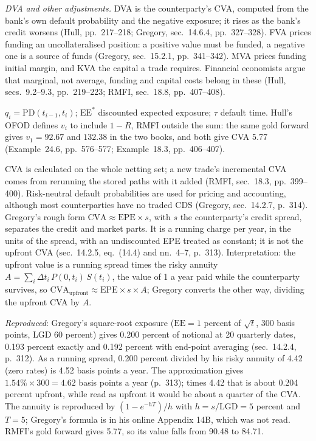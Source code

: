 \begin{qfmethod}
\emph{DVA and other adjustments.} DVA is the counterparty's CVA, computed from the bank's own default probability and the negative exposure; it rises as the bank's credit worsens (Hull, pp.~217--218; Gregory, sec.~14.6.4, pp.~327--328). FVA prices funding an uncollateralised position: a positive value must be funded, a negative one is a source of funds (Gregory, sec.~15.2.1, pp.~341--342). MVA prices funding initial margin, and KVA the capital a trade requires. Financial economists argue that marginal, not average, funding and capital costs belong in these (Hull, secs.~9.2--9.3, pp.~219--223; RMFI, sec.~18.8, pp.~407--408).

 $q_i=\mathrm{PD}(t_{i-1},t_i)$; $\mathrm{EE}^*$ discounted expected exposure; $\tau$ default time. Hull's OFOD defines $v_i$ to include $1-R$, RMFI outside the sum: the same gold forward gives $v_1=92.67$ and $132.38$ in the two books, and both give CVA 5.77 (Example~24.6, pp.~576--577; Example~18.3, pp.~406--407).

 CVA is calculated on the whole netting set; a new trade's incremental CVA comes from rerunning the stored paths with it added (RMFI, sec.~18.3, pp.~399--400). Risk-neutral default probabilities are used for pricing and accounting, although most counterparties have no traded CDS (Gregory, sec.~14.2.7, p.~314). Gregory's rough form $\mathrm{CVA}\approx\mathrm{EPE}\times s$, with $s$ the counterparty's credit spread, separates the credit and market parts. It is a running charge per year, in the units of the spread, with an undiscounted EPE treated as constant; it is not the upfront CVA (sec.~14.2.5, eq.~(14.4) and nn.~4--7, p.~313). Interpretation: the upfront value is a running spread times the risky annuity $A=\sum_i\Delta t_i\,P(0,t_i)\,S(t_i)$, the value of 1 a year paid while the counterparty survives, so $\mathrm{CVA}_{\text{upfront}}\approx\mathrm{EPE}\times s\times A$; Gregory converts the other way, dividing the upfront CVA by $A$.

 \emph{Reproduced}: Gregory's square-root exposure ($\mathrm{EE}=1$ percent of $\sqrt t$, 300 basis points, LGD 60 percent) gives 0.200 percent of notional at 20 quarterly dates, 0.193 percent exactly and 0.192 percent with end-point averaging (sec.~14.2.4, p.~312). As a running spread, 0.200 percent divided by his risky annuity of 4.42 (zero rates) is 4.52 basis points a year. The approximation gives $1.54\%\times300=4.62$ basis points a year (p.~313); times 4.42 that is about 0.204 percent upfront, while read as upfront it would be about a quarter of the CVA. The annuity is reproduced by $(1-e^{-hT})/h$ with $h=s/\mathrm{LGD}=5$ percent and $T=5$; Gregory's formula is in his online Appendix 14B, which was not read. RMFI's gold forward gives 5.77, so its value falls from 90.48 to 84.71.


\end{qfmethod}
